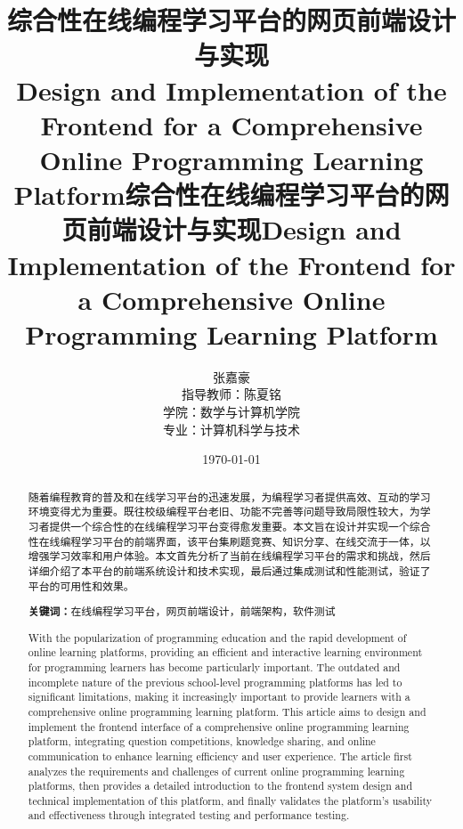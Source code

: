 \documentclass[12pt,a4paper]{article}
\renewcommand{\abstractname}{摘要}
\begin{document}
\begin{CJK*}{UTF8}{gbsn}

\title{\Huge 综合性在线编程学习平台的网页前端设计与实现\\[2ex]
\huge Design and Implementation of the Frontend for a Comprehensive Online Programming Learning Platform}

\author{\Large 张嘉豪\\[2ex]
指导教师：陈夏铭\\[2ex]
学院：数学与计算机学院\\
专业：计算机科学与技术}
\date{\Large\today}
\maketitle

\newpage
\title{\Huge 综合性在线编程学习平台的网页前端设计与实现}
\begin{abstract}
\noindent 
\hspace{2em}
随着编程教育的普及和在线学习平台的迅速发展，为编程学习者提供高效、互动的学习环境变得尤为重要。既往校级编程平台老旧、功能不完善等问题导致局限性较大，为学习者提供一个综合性的在线编程学习平台变得愈发重要。本文旨在设计并实现一个综合性在线编程学习平台的前端界面，该平台集刷题竞赛、知识分享、在线交流于一体，以增强学习效率和用户体验。本文首先分析了当前在线编程学习平台的需求和挑战，然后详细介绍了本平台的前端系统设计和技术实现，最后通过集成测试和性能测试，验证了平台的可用性和效果。

\vspace{1em}
\noindent \textbf{关键词：}在线编程学习平台，网页前端设计，前端架构，软件测试
\end{abstract}

\newpage
\title{\Huge Design and Implementation of the Frontend for a Comprehensive Online Programming Learning Platform}
\begin{abstract}
\renewcommand{\abstractname}{摘要}
\noindent 
\hspace{2em}
With the popularization of programming education and the rapid development of online learning platforms, providing an efficient and interactive learning environment for programming learners has become particularly important. The outdated and incomplete nature of the previous school-level programming platforms has led to significant limitations, making it increasingly important to provide learners with a comprehensive online programming learning platform. This article aims to design and implement the frontend interface of a comprehensive online programming learning platform, integrating question competitions, knowledge sharing, and online communication to enhance learning efficiency and user experience. The article first analyzes the requirements and challenges of current online programming learning platforms, then provides a detailed introduction to the frontend system design and technical implementation of this platform, and finally validates the platform's usability and effectiveness through integrated testing and performance testing.


\end{abstract}
\end{CJK*}
\end{document}
